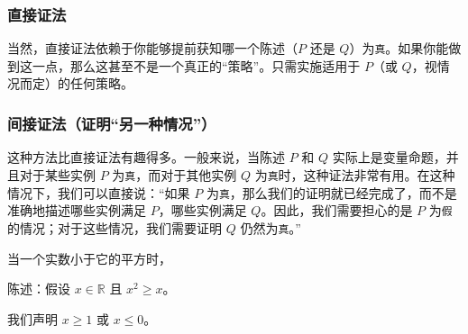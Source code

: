 \subsubsection*{直接证法}

\begin{center}
\noindent {}
\end{center}

当然，直接证法依赖于你能够提前获知哪一个陈述（$P$ 还是 $Q$）为\verb|真|。如果你能做到这一点，那么这甚至不是一个真正的``策略''。只需实施适用于 $P$（或 $Q$，视情况而定）的任何策略。

\subsubsection*{间接证法（证明``另一种情况''）}

这种方法比直接证法有趣得多。一般来说，当陈述 $P$ 和 $Q$ 实际上是变量命题，并且对于某些实例 $P$ 为\verb|真|，而对于其他实例 $Q$ 为\verb|真|时，这种证法非常有用。在这种情况下，我们可以直接说：``如果 $P$ 为\verb|真|，那么我们的证明就已经完成了，而不是准确地描述哪些实例满足 $P$，哪些实例满足 $Q$。因此，我们需要担心的是 $P$ 为\verb|假|的情况；对于这些情况，我们需要证明 $Q$ 仍然为\verb|真|。''

\begin{center}
    \noindent {}
\end{center}

\begin{example}
    当一个实数小于它的平方时，
    \begin{center}
        陈述：假设 $ x \in \mathbb{R}$ 且 $x^2 \ge x$。

        我们声明 $x \ge 1$ 或 $x \le 0$。
    \end{center}
\end{example}

